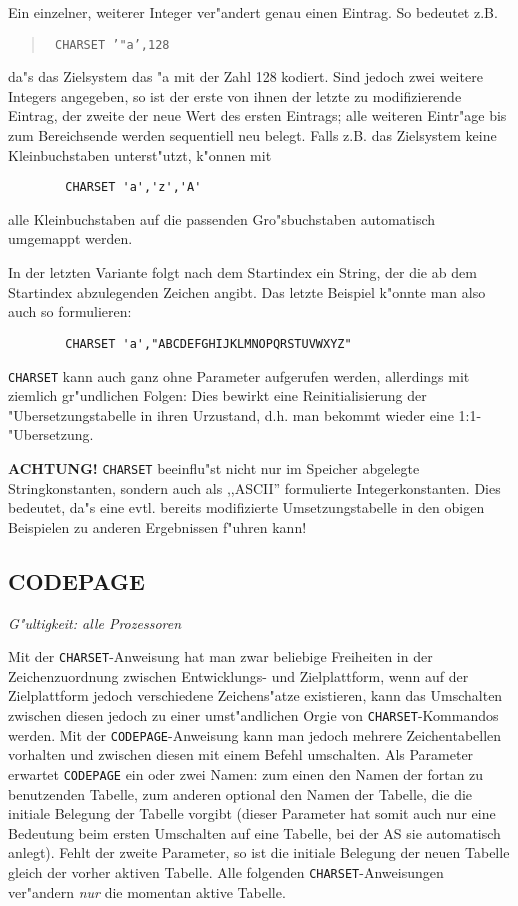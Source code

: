 \documentclass[12pt,a4paper,twoside]{report}
\makeatletter
\newcommand{\bb}[1]{{\bf #1}}
\newcommand{\tty}[1]{{\tt #1}}
\newcommand{\ttindex}[1]{\index{#1@{\tt #1}}}
\makeatother
\begin{document}
Ein einzelner, weiterer Integer ver"andert genau einen Eintrag.  So
bedeutet z.B.
\begin{quote}{\tt
        CHARSET '"a',128}
\end{quote}
da"s das Zielsystem das "a mit der Zahl 128 kodiert.  Sind jedoch zwei
weitere Integers angegeben, so ist der erste von ihnen der letzte zu
modifizierende Eintrag, der zweite der neue Wert des ersten Eintrags; alle
weiteren Eintr"age bis zum Bereichsende werden sequentiell neu belegt.
Falls z.B. das Zielsystem keine Kleinbuchstaben unterst"utzt, k"onnen mit
\begin{verbatim}
        CHARSET 'a','z','A'
\end{verbatim}
alle Kleinbuchstaben auf die passenden Gro"sbuchstaben automatisch
umgemappt werden.

In der letzten Variante folgt nach dem Startindex ein String, der die ab
dem Startindex abzulegenden Zeichen angibt.  Das letzte Beispiel k"onnte
man also auch so formulieren:
\begin{verbatim}
        CHARSET 'a',"ABCDEFGHIJKLMNOPQRSTUVWXYZ"
\end{verbatim}

\tty{CHARSET} kann auch ganz ohne Parameter aufgerufen werden, allerdings
mit ziemlich gr"undlichen Folgen: Dies bewirkt eine Reinitialisierung der
"Ubersetzungstabelle in ihren Urzustand, d.h. man bekommt wieder eine
1:1-"Ubersetzung.

\bb{ACHTUNG!} \tty{CHARSET} beeinflu"st nicht nur im Speicher abgelegte
Stringkonstanten, sondern auch als ,,ASCII'' formulierte Integerkonstanten.
Dies bedeutet, da"s eine evtl. bereits modifizierte Umsetzungstabelle
in den obigen Beispielen zu anderen Ergebnissen f"uhren kann!


\subsection{CODEPAGE}
\ttindex{CODEPAGE}

{\em G"ultigkeit: alle Prozessoren}

Mit der \tty{CHARSET}-Anweisung hat man zwar beliebige Freiheiten in der
Zeichenzuordnung zwischen Entwicklungs- und Zielplattform, wenn auf der
Zielplattform jedoch verschiedene Zeichens"atze existieren, kann das
Umschalten zwischen diesen jedoch zu einer umst"andlichen Orgie von
\tty{CHARSET}-Kommandos werden.  Mit der \tty{CODEPAGE}-Anweisung kann
man jedoch mehrere Zeichentabellen vorhalten und zwischen diesen mit einem
Befehl umschalten.  Als Parameter erwartet \tty{CODEPAGE} ein oder zwei
Namen: zum einen den Namen der fortan zu benutzenden Tabelle, zum anderen
optional den Namen der Tabelle, die die initiale Belegung der Tabelle
vorgibt (dieser Parameter hat somit auch nur eine Bedeutung beim ersten
Umschalten auf eine Tabelle, bei der AS sie automatisch anlegt).  Fehlt
der zweite Parameter, so ist die initiale Belegung der neuen Tabelle
gleich der vorher aktiven Tabelle.  Alle folgenden
\tty{CHARSET}-Anweisungen ver"andern {\em nur} die momentan aktive Tabelle.
\end{document}
